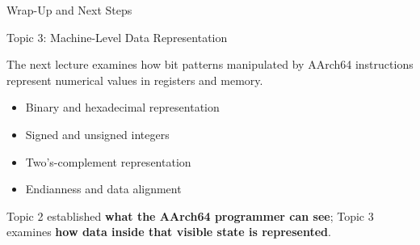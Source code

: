 \documentclass[aspectratio=169,11pt,t]{beamer}
\newcommand{\key}[1]{\textbf{#1}}
\begin{document}
\begin{frame}{Wrap-Up and Next Steps}

\begin{block}{Topic 3: Machine-Level Data Representation}

The next lecture examines
how bit patterns manipulated
by AArch64 instructions
represent numerical values
in registers and memory.

\begin{itemize}
  \item Binary and hexadecimal representation
  \item Signed and unsigned integers
  \item Two's-complement representation
  \item Endianness and data alignment
\end{itemize}

\end{block}

\vspace{0.1cm}

Topic 2 established
\key{what the AArch64 programmer can see};
Topic 3 examines
\key{how data inside that visible state is represented}.

\end{frame}
\end{document}
